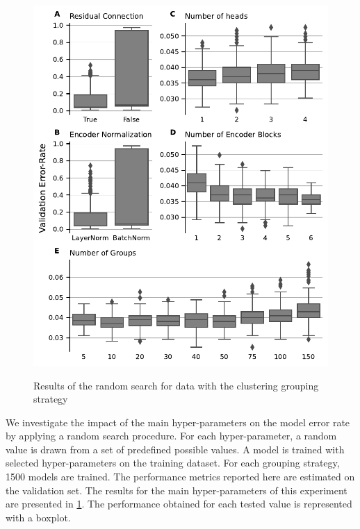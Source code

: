 \documentclass[../main.tex]{subfiles}
\begin{document}
	    \begin{figure}[htbp]
	        \centering
	        \begin{subcaptiongroup}
	            \includegraphics[width=0.9\linewidth]{Beaude.168.fig.2.pdf}
	            \label{fig:attomics_hparams_search_A}
	            \label{fig:attomics_hparams_search_B}
	            \label{fig:attomics_hparams_search_C}
	            \label{fig:attomics_hparams_search_D}
	            \label{fig:attomics_hparams_search_E}
	        \end{subcaptiongroup}
	        \caption[Attomics hyperparameters search results]{Results of the random search for  data with the clustering grouping strategy}\label{fig:hparams_search}
	    \end{figure}

	    We investigate the impact of the main hyper-parameters on the model error rate by applying a random search procedure.
	    For each hyper-parameter, a random value is drawn from a set of predefined possible values.
	    A model is trained with selected hyper-parameters on the training dataset.
	    For each grouping strategy, 1500 models are trained.
	    The performance metrics reported here are estimated on the validation set.
	    The results for the main hyper-parameters of this experiment are presented in \cref{fig:hparams_search}.
	    The performance obtained for each tested value is represented with a boxplot.
\end{document}
